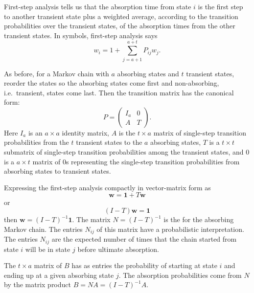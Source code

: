 \documentclass[12pt]{article}
\begin{document}
First-step analysis%
tells us that the absorption time from state \( i \) is the first step
to another transient state plus a weighted average, according to the
transition probabilities over the transient states, of the absorption
times from the other transient states.  In symbols, first-step analysis
says
\[
    w_i = 1 + \sum\limits_{j=a+1}^{a+t} P_{ij} w_j.
\]


As before, for a Markov chain with \( a \) absorbing states and \( t \)
transient states, reorder the states so the absorbing states come first
and non-absorbing, i.e.\ transient, states come last. Then the
transition matrix has the canonical form:
\[
    P =
    \begin{pmatrix}
        I_a & 0 \\
        A & T
    \end{pmatrix}
    .
\] Here \( I_{a} \) is an \( a \times a \) identity matrix, \( A \) is
the \( t \times a \) matrix of single-step transition probabilities from
the \( t \) transient states to the \( a \) absorbing states, \( T \) is
a \( t \times t \) submatrix of single-step transition probabilities
among the transient states, and \( 0 \) is a \( a \times t \) matrix of \(
0 \)s representing the single-step transition probabilities from
absorbing states to transient states.

Expressing the first-step analysis compactly in vector-matrix form as
\[
    \mathbf{w} = \mathbf{1} + T \mathbf{w}
\] or
\[
    (I - T) \mathbf{w} = \mathbf{1}
\] then \( \mathbf{w} = (I-T)^{-1} \mathbf{1} \).  The matrix \( N = (I-T)^
{-1} \) is the %
for the absorbing Markov chain.  The entries \( N_{ij} \) of this matrix
have a probabilistic interpretation.  The entries \( N_{ij} \) are the
expected number of times that the chain started from state \( i \) will
be in state \( j \) before ultimate absorption.

The \( t \times a \) matrix of %
\( B \) has as entries the probability of starting at state \( i \) and ending up
at a given absorbing state \( j \).  The absorption probabilities come
from \( N \) by the matrix product \( B = NA = (I-T)^{-1}A \).  
\end{document}
